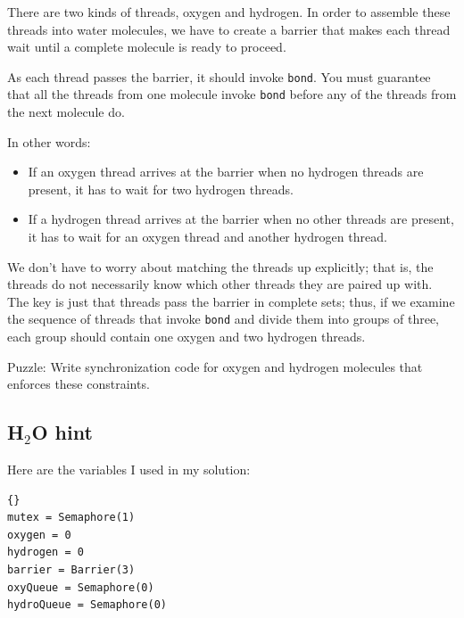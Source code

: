 \documentclass{book}
\newcommand{\clearemptydoublepage}{\newpage\cleardoublepage}
\begin{document}
There are two kinds of threads, oxygen and hydrogen.  In order
to assemble these threads into water molecules, we have to
create a barrier that makes each thread wait until a
complete molecule is ready to proceed.

As each thread passes the barrier, it should invoke
{\tt bond}.  You must guarantee that all the threads
from one molecule invoke {\tt bond} before any of the threads
from the next molecule do.

In other words:

\begin{itemize}

\item If an oxygen thread arrives at the barrier when no
hydrogen threads are present, it has to wait for two
hydrogen threads.

\item If a hydrogen thread arrives at the barrier when
no other threads are present, it has to wait for an
oxygen thread and another hydrogen thread.

\end{itemize}

We don't have to worry about matching the threads up explicitly; that
is, the threads do not necessarily know which other threads they are
paired up with.  The key is just that threads pass the barrier in
complete sets; thus, if we examine the sequence of threads that invoke
{\tt bond} and divide them into groups of three, each group should
contain one oxygen and two hydrogen threads.

Puzzle: Write synchronization code for oxygen and hydrogen
molecules that enforces these constraints.


\clearemptydoublepage
\subsection {H$_2$O hint}

Here are the variables I used in my solution:

\begin{latin}
\begin{latin}
\begin{lstlisting}[title={Water building hint}]{}
mutex = Semaphore(1)
oxygen = 0
hydrogen = 0
barrier = Barrier(3)
oxyQueue = Semaphore(0)
hydroQueue = Semaphore(0)
\end{lstlisting}
\end{latin}
\end{latin}
\end{document}
